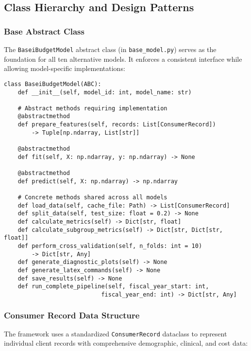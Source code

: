 \subsection{Class Hierarchy and Design Patterns}

\subsubsection{Base Abstract Class}

The \texttt{BaseiBudgetModel} abstract class (in \texttt{base\_model.py}) serves as the foundation for all ten alternative models. It enforces a consistent interface while allowing model-specific implementations:

\begin{verbatim}
class BaseiBudgetModel(ABC):
    def __init__(self, model_id: int, model_name: str)
    
    # Abstract methods requiring implementation
    @abstractmethod
    def prepare_features(self, records: List[ConsumerRecord]) 
        -> Tuple[np.ndarray, List[str]]
    
    @abstractmethod
    def fit(self, X: np.ndarray, y: np.ndarray) -> None
    
    @abstractmethod
    def predict(self, X: np.ndarray) -> np.ndarray
    
    # Concrete methods shared across all models
    def load_data(self, cache_file: Path) -> List[ConsumerRecord]
    def split_data(self, test_size: float = 0.2) -> None
    def calculate_metrics(self) -> Dict[str, float]
    def calculate_subgroup_metrics(self) -> Dict[str, Dict[str, float]]
    def perform_cross_validation(self, n_folds: int = 10) 
        -> Dict[str, Any]
    def generate_diagnostic_plots(self) -> None
    def generate_latex_commands(self) -> None
    def save_results(self) -> None
    def run_complete_pipeline(self, fiscal_year_start: int, 
                            fiscal_year_end: int) -> Dict[str, Any]
\end{verbatim}

\subsubsection{Consumer Record Data Structure}

The framework uses a standardized \texttt{ConsumerRecord} dataclass to represent individual client records with comprehensive demographic, clinical, and cost data:

